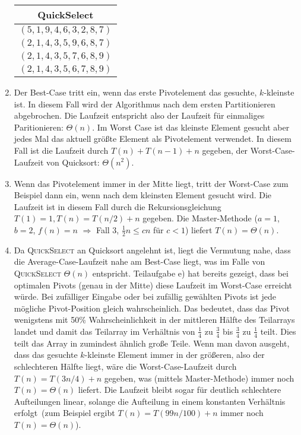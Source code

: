 \documentclass[11pt,a4paper]{article}
\begin{document}
\begin{loesung}
\begin{enumerate}
        \begin{table}[h!]
            \centering
            \begin{tabular}{|c|}
            \hline
            \textbf{QuickSelect} \\ \hline
                $(5, 1, 9, 4, 6, 3, 2, 8, 7)$ \\ \hline
                $(2, 1, 4, 3, 5, 9, 6, 8, 7)$ \\ \hline
                $(2, 1, 4, 3, 5, 7, 6, 8, 9)$ \\ \hline
                $(2, 1, 4, 3, 5, 6, 7, 8, 9)$ \\ \hline
            \end{tabular}
        \end{table}
        \FloatBarrier

        \item
        Der Best-Case tritt ein, wenn das erste Pivotelement das gesuchte, $k$-kleinste ist.
        In diesem Fall wird der Algorithmus nach dem ersten Partitionieren abgebrochen.
        Die Laufzeit entspricht also der Laufzeit für einmaliges Paritionieren: $\Theta(n)$.
        Im Worst Case ist das kleinste Element gesucht aber jedes Mal das aktuell größte Element als Pivotelement verwendet.
        In diesem Fall ist die Laufzeit durch $T(n) + T(n - 1) + n$ gegeben, der Worst-Case-Laufzeit von Quicksort: $\Theta(n^2)$.

        \item
        Wenn das Pivotelement immer in der Mitte liegt, tritt der Worst-Case zum Beispiel dann ein, wenn nach dem kleinsten Element gesucht wird.
        Die Laufzeit ist in diesem Fall durch die Rekursionsgleichung $T(1) = 1, T(n) = T(n / 2) + n$ gegeben. Die Master-Methode ($a = 1$, $b = 2$, $f(n) = n$ $\Rightarrow$ Fall 3, $\frac{1}{2} n \leq cn$ für $c < 1$) liefert $T(n) = \Theta(n)$.

        \item Da \textsc{QuickSelect} an Quicksort angelehnt ist, liegt die Vermutung nahe, dass die Average-Case-Laufzeit nahe am Best-Case liegt, was im Falle von \textsc{QuickSelect} $\Theta(n)$ entspricht.
        Teilaufgabe e) hat bereits gezeigt, dass bei optimalen Pivots (genau in der Mitte) diese Laufzeit im Worst-Case erreicht würde.
        Bei zufälliger Eingabe oder bei zufällig gewählten Pivots ist jede mögliche Pivot-Position gleich wahrscheinlich.
        Das bedeutet, dass das Pivot wenigstens mit 50\% Wahrscheinlichkeit in der mittleren Hälfte des Teilarrays landet und damit das Teilarray im Verhältnis von $\frac{1}{4}$ zu $\frac{3}{4}$ bis $\frac{3}{4}$ zu $\frac{1}{4}$ teilt. 
        Dies teilt das Array in zumindest ähnlich große Teile.
        Wenn man davon ausgeht, dass das gesuchte $k$-kleinste Element immer in der größeren, also der \glqq{}schlechteren\grqq{} Hälfte liegt, wäre die Worst-Case-Laufzeit durch $T(n) = T(3n / 4) + n$ gegeben, was (mittels Master-Methode) immer noch $T(n) = \Theta(n)$ liefert.
        Die Laufzeit bleibt sogar für deutlich schlechtere Aufteilungen linear, solange die Aufteilung in einem konstanten Verhältnis erfolgt~(zum Beispiel ergibt $T(n) = T(99n / 100) + n$ immer noch $T(n) = \Theta(n)$).


\end{enumerate}
\end{loesung}
\end{document}

